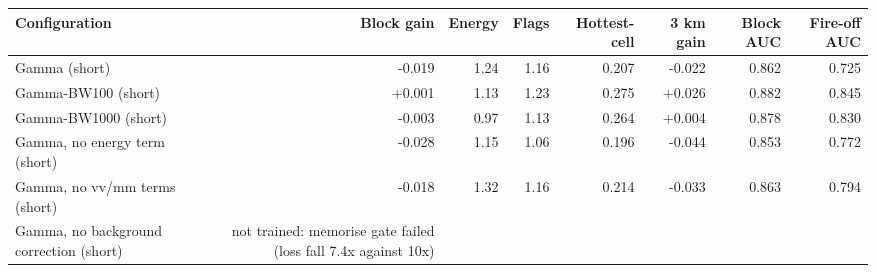 \begin{tabular}{lrrrrrrr}
\toprule
Configuration & Block gain & Energy & Flags & Hottest-cell & 3 km gain & Block AUC & Fire-off AUC \\
\midrule
Gamma (short) & -0.019 & 1.24 & 1.16 & 0.207 & -0.022 & 0.862 & 0.725 \\
Gamma-BW100 (short) & +0.001 & 1.13 & 1.23 & 0.275 & +0.026 & 0.882 & 0.845 \\
Gamma-BW1000 (short) & -0.003 & 0.97 & 1.13 & 0.264 & +0.004 & 0.878 & 0.830 \\
Gamma, no energy term (short) & -0.028 & 1.15 & 1.06 & 0.196 & -0.044 & 0.853 & 0.772 \\
Gamma, no vv/mm terms (short) & -0.018 & 1.32 & 1.16 & 0.214 & -0.033 & 0.863 & 0.794 \\
Gamma, no background correction (short) & not trained: memorise gate failed (loss fall 7.4x against 10x) &  &  &  &  &  &  \\
\bottomrule
\end{tabular}
